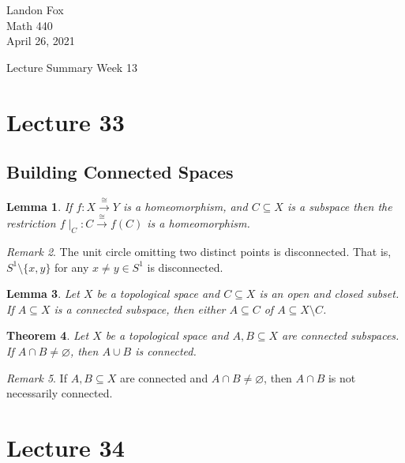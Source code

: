 \documentclass[ 12pt ]{article}
\newcounter{lecture_num}
\theoremstyle{plain}
\theoremstyle{plain}
\newtheorem{theorem}{Theorem}[lecture_num]
\newtheorem{lemma}[theorem]{Lemma}
\theoremstyle{definition}
\theoremstyle{remark}
\newtheorem{remark}[theorem]{Remark}
\begin{document}
\noindent Landon Fox \\
\noindent Math 440 \\
\noindent April 26, 2021

\begin{center}
	\Large Lecture Summary Week 13
\end{center}

\setcounter{lecture_num}{33}
\setcounter{theorem}{0}
\section*{Lecture 33}

\subsection*{Building Connected Spaces}

\begin{lemma}
	If $f : X \overset{\cong}{\to} Y$ is a homeomorphism, and $C \subseteq X$ is a subspace then the restriction $f \mid_C : C \overset{\cong}{\to} f(C)$ is a homeomorphism.
\end{lemma}

\begin{remark}
	The unit circle omitting two distinct points is disconnected. That is, $S^1 \setminus \{ x, y \}$ for any $x \neq y \in S^1$ is disconnected.
\end{remark}

\begin{lemma}
	Let $X$ be a topological space and $C \subseteq X$ is an open and closed subset. If $A \subseteq X$ is a connected subspace, then either $A \subseteq C$ of $A \subseteq X \setminus C$.
\end{lemma}

\begin{theorem}
	Let $X$ be a topological space and $A, B \subseteq X$ are connected subspaces. If $A \cap B \neq \varnothing$, then $A \cup B$ is connected.
\end{theorem}

\begin{remark}
	If $A, B \subseteq X$ are connected and $A \cap B \neq \varnothing$, then $A \cap B$ is not necessarily connected.
\end{remark}


\setcounter{lecture_num}{34}
\setcounter{theorem}{0}
\section*{Lecture 34}
\end{document}
